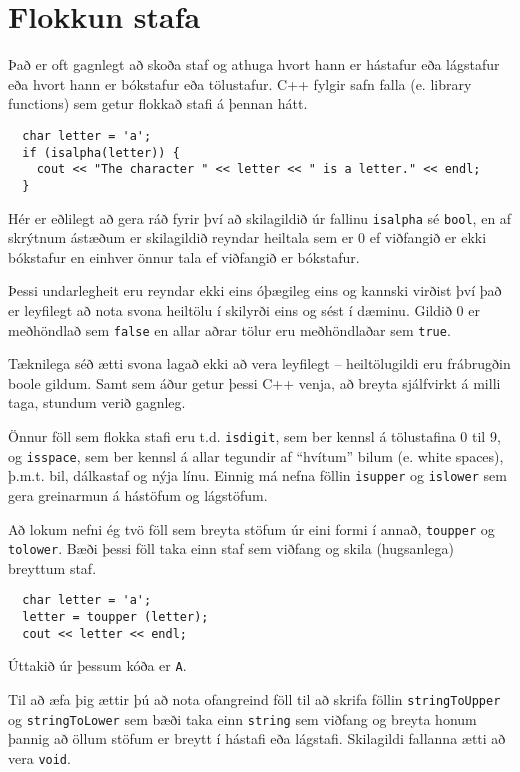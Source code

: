 \section{Flokkun stafa}

Það er oft gagnlegt að skoða staf og athuga hvort hann er hástafur eða lágstafur eða hvort hann er bókstafur eða tölustafur.
C++ fylgir safn falla (e. library functions) sem getur flokkað stafi á þennan hátt.

\begin{verbatim}
  char letter = 'a';
  if (isalpha(letter)) {
    cout << "The character " << letter << " is a letter." << endl;
  }
\end{verbatim}
%
Hér er eðlilegt að gera ráð fyrir því að skilagildið úr fallinu {\tt isalpha} sé {\tt bool}, 
en af skrýtnum ástæðum er skilagildið reyndar heiltala sem er 0 ef viðfangið er ekki bókstafur en einhver önnur tala ef viðfangið er bókstafur.

Þessi undarlegheit eru reyndar ekki eins óþægileg eins og kannski virðist því það er leyfilegt að nota svona heiltölu í skilyrði eins og sést í dæminu.
Gildið 0 er meðhöndlað sem {\tt false} en allar aðrar tölur eru meðhöndlaðar sem {\tt true}.

Tæknilega séð ætti svona lagað ekki að vera leyfilegt -- heiltölugildi eru frábrugðin boole gildum.
Samt sem áður getur þessi C++ venja, að breyta sjálfvirkt á milli taga, stundum verið gagnleg.

Önnur föll sem flokka stafi eru t.d. {\tt isdigit}, sem ber kennsl á tölustafina 0 til 9, 
og {\tt isspace}, sem ber kennsl á allar tegundir af ``hvítum'' bilum (e. white spaces), þ.m.t. bil, dálkastaf og nýja línu.
Einnig má nefna föllin {\tt isupper} og {\tt islower} sem gera greinarmun á hástöfum og lágstöfum.

Að lokum nefni ég tvö föll sem breyta stöfum úr eini formi í annað, {\tt toupper} og {\tt tolower}.
Bæði þessi föll taka einn staf sem viðfang og skila (hugsanlega) breyttum staf. 

\begin{verbatim}
  char letter = 'a';
  letter = toupper (letter);
  cout << letter << endl;
\end{verbatim}
%
Úttakið úr þessum kóða er {\tt A}.

Til að æfa þig ættir þú að nota ofangreind föll til að skrifa föllin {\tt stringToUpper} og
{\tt stringToLower} sem bæði taka einn {\tt string} sem viðfang og breyta honum þannig að öllum stöfum er breytt í hástafi eða lágstafi.
Skilagildi fallanna ætti að vera {\tt void}.

